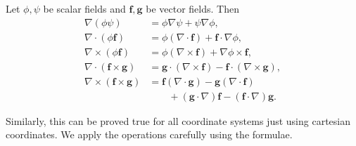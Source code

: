 \begin{proposition}
Let \(\phi,\psi\) be scalar fields and \(\boldsymbol{f},\boldsymbol{g}\) be vector fields. Then
\begin{align*}
\nabla(\phi\psi)
&= \phi\nabla\psi+\psi\nabla\phi,\\[6pt]
\nabla\cdot(\phi\boldsymbol{f})
&= \phi(\nabla\cdot\boldsymbol{f})
+\boldsymbol{f}\cdot\nabla\phi,\\[6pt]
\nabla\times(\phi\boldsymbol{f})
&= \phi(\nabla\times\boldsymbol{f})
+\nabla\phi\times\boldsymbol{f},\\[6pt]
\nabla\cdot(\boldsymbol{f}\times\boldsymbol{g})
&= \boldsymbol{g}\cdot(\nabla\times\boldsymbol{f})
-\boldsymbol{f}\cdot(\nabla\times\boldsymbol{g}),\\[6pt]
\nabla\times(\boldsymbol{f}\times\boldsymbol{g})
&= \boldsymbol{f}(\nabla\cdot\boldsymbol{g})
-\boldsymbol{g}(\nabla\cdot\boldsymbol{f})\\
&\qquad +(\boldsymbol{g}\cdot\nabla)\boldsymbol{f}
-(\boldsymbol{f}\cdot\nabla)\boldsymbol{g}.
\end{align*}
\end{proposition}

\begin{proofidea}
  Similarly, this can be proved true for all coordinate systems just using cartesian coordinates. We apply the operations carefully using the formulae.
  
\end{proofidea}
  
